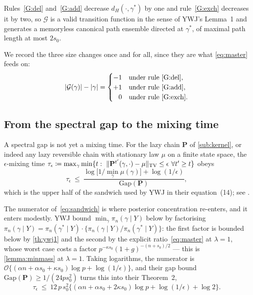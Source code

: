 \documentclass[aos]{imsart}
\DeclarePairedDelimiter{\norm}{\lVert}{\rVert}
\DeclarePairedDelimiter{\abs}{\lvert}{\rvert}
\theoremstyle{plain}
\theoremstyle{definition}
\begin{document}
    Rules~\ref{G:del} and~\ref{G:add} decrease
    $d_H(\cdot,\gamma^{\ast})$ by one and rule~\ref{G:exch} decreases it by
    two, so $\mathcal{G}$ is a valid transition function in the sense of
    YWJ's Lemma~1 and generates a memoryless canonical path ensemble directed
    at $\gamma^{\ast}$, of maximal path length at most $2s_0$.


    We record the three size changes once and for all, since they are what
    \eqref{eq:master} feeds on:
    \begin{equation}
        \label{eq:sizechange}
        \abs{\mathcal{G}(\gamma)}-\abs \gamma=
        \begin{cases}
            -1 & \text{under rule~\ref{G:del}},\\
            +1 & \text{under rule~\ref{G:add}},\\
            \phantom{+}0 & \text{under rule~\ref{G:exch}}.
        \end{cases}
    \end{equation}

    \subsection{From the spectral gap to the mixing time}
    \label{sub:gap2mix}

    A spectral gap is not yet a mixing time. For the lazy chain $\mathbf{P}$
    of \cref{sub:kernel}, or indeed any lazy reversible chain with
    stationary law $\mu$ on a finite state space, the
    $\epsilon$-mixing time
    $\tau_\epsilon\coloneq\max_\gamma\min\{t:\
    \norm{\mathbf{P}^{t'}(\gamma,\cdot)-\mu}_{\mathrm{TV}}\leq\epsilon\
    \forall t'\geq t\}$ obeys
    \begin{equation}
        \label{eq:sandwich}
        \tau_\epsilon\ \leq\
        \frac{\log\bigl[1/\min_\gamma\mu(\gamma)\bigr]
        +\log(1/\epsilon)}{\mathrm{Gap}(\mathbf{P})} ,
    \end{equation}
    which is the upper half of the sandwich used by YWJ in their
    equation~(14); see \citet{Sinclair1992}.

    The numerator of~\eqref{eq:sandwich} is where posterior concentration
    re-enters, and it enters modestly. YWJ bound
    $\min_\gamma\pi_n(\gamma\mid Y)$ below by factorising
    $\pi_n(\gamma\mid Y)=\pi_n(\gamma^{\ast}\mid Y)\cdot
    \{\pi_n(\gamma\mid Y)/\pi_n(\gamma^{\ast}\mid Y)\}$: the first factor is
    bounded below by \cref{th:ywj1} and the second by the explicit
    ratio~\eqref{eq:master} at $\lambda=1$, whose worst case costs a factor
    $p^{-\kappa s_0}(1+g)^{-(n+s_0)/2}$ --- this is \cref{lemma:minmass} at
    $\lambda=1$. Taking logarithms, the numerator is
    $\mathcal{O}\{(\alpha n+\alpha s_0+\kappa s_0)\log p+\log(1/\epsilon)\}$,
    and their gap bound $\mathrm{Gap}(\mathbf{P})\geq1/(24ps_0^{2})$ turns
    this into their Theorem~2,
    \begin{equation*}
        \tau_\epsilon\ \leq\ 12\,p\,s_0^{2}
        \bigl\{(\alpha n+\alpha s_0+2\kappa s_0)\log p
        +\log(1/\epsilon)+\log2\bigr\} .
    \end{equation*}
\end{document}
